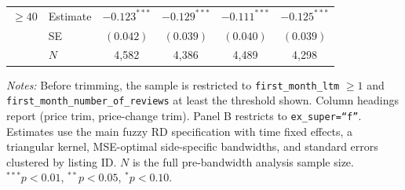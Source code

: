 \begin{table}[!htbp]
\begin{tabular}{llcccc}
$\geq 40$ & Estimate & $-0.123^{***}$ & $-0.129^{***}$ & $-0.111^{***}$ & $-0.125^{***}$ \\
 & SE & $(0.042)$ & $(0.039)$ & $(0.040)$ & $(0.039)$ \\
 & $N$ & 4,582 & 4,386 & 4,489 & 4,298 \\
\bottomrule
\end{tabular}
\begin{minipage}{0.96\textwidth}
\footnotesize
\textit{Notes:} Before trimming, the sample is restricted to \texttt{first\_month\_ltm} $\geq 1$ and \texttt{first\_month\_number\_of\_reviews} at least the threshold shown. Column headings report (price trim, price-change trim). Panel B restricts to \texttt{ex\_super=``f''}. Estimates use the main fuzzy RD specification with time fixed effects, a triangular kernel, MSE-optimal side-specific bandwidths, and standard errors clustered by listing ID. $N$ is the full pre-bandwidth analysis sample size. $^{***}p<0.01$, $^{**}p<0.05$, $^{*}p<0.10$.
\end{minipage}
\end{table}
\clearpage


